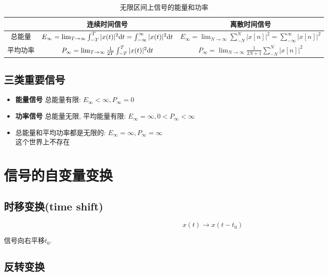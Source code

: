     \begin{table}[h]\centering
        \caption{无限区间上信号的能量和功率}
        \label{tab:2:universal-energy-and-power}
        \begin{tabular}{ccc} \toprule
            & 连续时间信号 & 离散时间信号 \\ \midrule
            总能量 & $ E_\infty=\lim_{T\to \infty}\int_{-T}^T|x(t)|^2\mathrm{d} t=\int_{-\infty}^\infty|x(t)|^2\mathrm{d} t $ & $E_\infty=\lim_{N\to \infty}\sum_{-N}^N|x[n]|^2=\sum_{-\infty}^\infty|x[n]|^2$\\ 
            平均功率 & $P_\infty=\lim_{T\to \infty}\frac{1}{2T}\int_{-T}^T|x(t)|^2\mathrm{d} t$ & $P_\infty=\lim_{N\to \infty}\frac{1}{2N+1}\sum_{-N}^N|x[n]|^2$ \\ \bottomrule
        \end{tabular}
    \end{table}

    \subsection{三类重要信号}
    
    \begin{itemize}
        \item \textbf{能量信号} 总能量有限: $E_\infty<\infty, P_\infty=0$
        \item \textbf{功率信号} 总能量无限, 平均能量有限: $E_\infty=\infty, 0<P_\infty<\infty$
        \item 总能量和平均功率都是无限的: $E_\infty=\infty, P_\infty=\infty$ \\
            这个世界上不存在
    \end{itemize}

\section{信号的自变量变换}

    \subsection{时移变换(time shift)}

        \[x(t)\to x(t-t_0)\]

        信号向右平移$t_0$.

    \subsection{反转变换}

